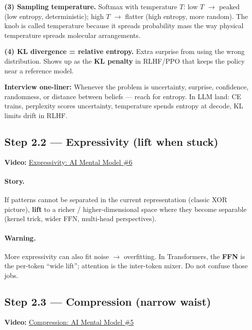 \documentclass[11pt,a4paper]{article}
\begin{document}
\textbf{(3) Sampling temperature.}   Softmax with temperature \(T\): low \(T\) $\rightarrow$ peaked (low entropy, deterministic); high \(T\) $\rightarrow$ flatter (high entropy, more random). The knob is called temperature because it spreads probability mass the way physical temperature spreads molecular arrangements.


\textbf{(4) KL divergence = relative entropy.}   Extra surprise from using the wrong distribution. Shows up as the \textbf{KL penalty} in RLHF/PPO that keeps the policy near a reference model.


\textbf{Interview one-liner:} Whenever the problem is uncertainty, surprise, confidence, randomness, or distance between beliefs --- reach for entropy. In LLM land: CE trains, perplexity scores uncertainty, temperature spends entropy at decode, KL limits drift in RLHF.


\subsection{Step 2.2 --- Expressivity (lift when stuck)}


\textbf{Video:} \href{https://www.youtube.com/watch?v=YE0udJCgDqc}{Expressivity: AI Mental Model \#6}


\paragraph{Story.}

If patterns cannot be separated in the current representation (classic XOR picture), \textbf{lift} to a richer / higher-dimensional space where they become separable (kernel trick, wider FFN, multi-head perspectives).


\paragraph{Warning.}

More expressivity can also fit noise $\rightarrow$ overfitting. In Transformers, the \textbf{FFN} is the per-token ``wide lift''; attention is the inter-token mixer. Do not confuse those jobs.


\subsection{Step 2.3 --- Compression (narrow waist)}


\textbf{Video:} \href{https://www.youtube.com/watch?v=hGS6RbAYLl0}{Compression: AI Mental Model \#5}
\end{document}
